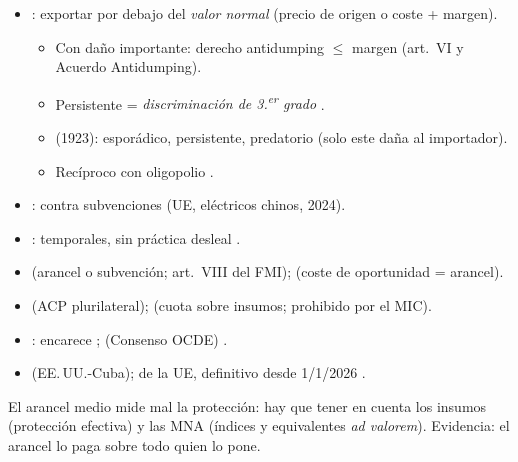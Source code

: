 \documentclass{article}
\begin{document}
\begin{columnas}
\begin{itemize}
\item {}: exportar por debajo del \emph{valor normal} (precio de origen o coste + margen).
  \begin{itemize}
  \item Con daño importante: derecho antidumping $\le$ margen (art.~VI y Acuerdo Antidumping).
  \item Persistente = \emph{discriminación de 3.\textsuperscript{er} grado} .
  \item {} (1923): esporádico, persistente, predatorio (solo este daña al importador).
  \item Recíproco con oligopolio .
  \end{itemize}
\item {}: contra subvenciones (UE, eléctricos chinos, 2024).
\item {}: temporales, sin práctica desleal  .
\end{itemize}
\begin{itemize}
\item {} (arancel o subvención; art.~VIII del FMI);  (coste de oportunidad = arancel).
\item {} (ACP plurilateral);  (cuota sobre insumos; prohibido por el MIC).
\item {}: encarece  ;  (Consenso OCDE) .
\item {} (EE.\,UU.-Cuba);  de la UE, definitivo desde 1/1/2026 .
\end{itemize}

\begin{ideaclave}
El arancel medio mide mal la protección: hay que tener en cuenta los insumos (protección efectiva) y las MNA (índices y equivalentes \emph{ad valorem}). Evidencia: el arancel lo paga sobre todo quien lo pone.
\end{ideaclave}


\end{columnas}
\end{document}
